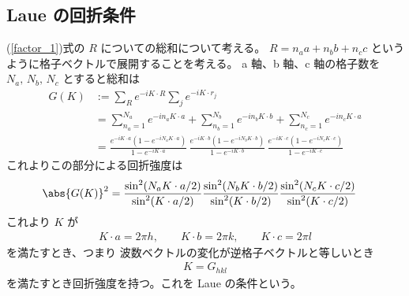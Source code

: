 \documentclass[11pt,dvipdfmx,a4paper]{jsarticle}
\begin{document}
\subsection{Laue の回折条件}
(\ref{factor_1})式の \(R\) についての総和について考える。
\(R = n_a a + n_b b + n_c c\) というように格子ベクトルで展開することを考える。
a 軸、b 軸、c 軸の格子数を\(N_a,\,N_b,\,N_c\) とすると総和は
\begin{align}
	G(K) &:= \sum_R e^{-iK\cdot R}\sum_j e^{-iK\cdot r_j}\\
	&= \sum_{n_a=1}^{N_a} e^{-in_aK\cdot a} + \sum_{n_b=1}^{N_b} e^{-in_bK\cdot b} + \sum_{n_c=1}^{N_c} e^{-in_cK\cdot a}\\
	&=\frac{e^{-iK\cdot a} (1-e^{-iN_a K\cdot a})}{1-e^{-iK\cdot a}}\,
	\frac{e^{-iK\cdot b} (1-e^{-iN_b K\cdot b})}{1-e^{-iK\cdot b}}\,
	\frac{e^{-iK\cdot c} (1-e^{-iN_c K\cdot c})}{1-e^{-iK\cdot c}}
\end{align}
これよりこの部分による回折強度は
\begin{align}
	\abs{G(K)}^2 &= \dfrac{\sin^2(N_a K\cdot a/2)}{\sin^2(K\cdot a/2)}
	\dfrac{\sin^2(N_b K\cdot b/2)}{\sin^2(K\cdot b/2)}
	\dfrac{\sin^2(N_c K\cdot c/2)}{\sin^2(K\cdot c/2)}
\end{align}
これより \(K\) が
\begin{align}
	K\cdot a = 2\pi h, \qquad K\cdot b =2\pi k, \qquad K\cdot c =2\pi l
\end{align}
を満たすとき、つまり 波数ベクトルの変化が逆格子ベクトルと等しいとき
\begin{align}
	K = G_{hkl}
\end{align}
を満たすとき回折強度を持つ。これを Laue の条件という。
\end{document}
